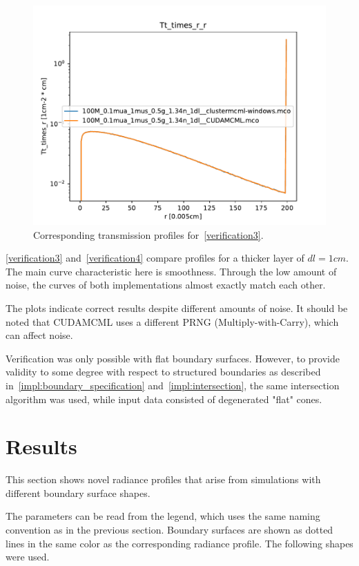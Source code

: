 \documentclass[]{article}
\begin{document}
\begin{figure}[ht!]
\includegraphics[width=\linewidth]{img/verification4.pdf}
\caption{Corresponding transmission profiles for~\autoref{verification3}.}
\label{verification4}
\end{figure}

\autoref{verification3} and~\autoref{verification4} compare profiles for a thicker layer of $dl=1cm$. The main curve characteristic here is smoothness. Through the low amount of noise, the curves of both implementations almost exactly match each other.

The plots indicate correct results despite different amounts of noise. It should be noted that CUDAMCML uses a different PRNG (Multiply-with-Carry), which can affect noise.

Verification was only possible with flat boundary surfaces. However, to provide validity to some degree with respect to structured boundaries as described in~\autoref{impl:boundary_specification} and~\autoref{impl:intersection}, the same intersection algorithm was used, while input data consisted of degenerated "flat" cones.

\section{Results}

This section shows novel radiance profiles that arise from simulations with different boundary surface shapes.

The parameters can be read from the legend, which uses the same naming convention as in the previous section. Boundary surfaces are shown as dotted lines in the same color as the corresponding radiance profile. The following shapes were used.
\end{document}
